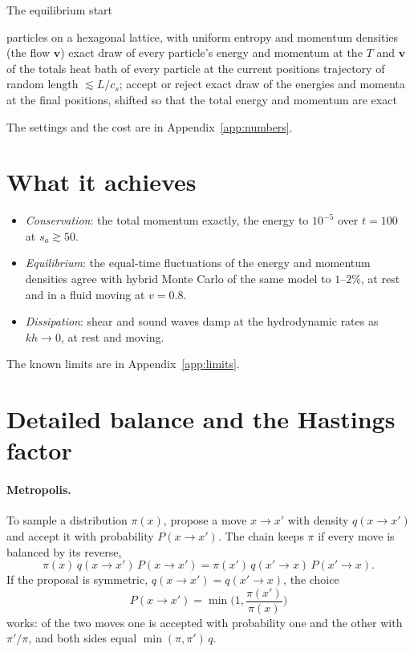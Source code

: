 \documentclass[11pt,aps,preprint,nofootinbib,superscriptaddress,tightenlines]{revtex4-2}
\def\st{\begin{equation}}
\def\stp{\end{equation}}
\def\App#1{Appendix~\ref{#1}}
\let\oldparagraph\paragraph
\renewcommand{\paragraph}{\par\bigskip\oldparagraph}
\begin{document}
\begin{algobox}{The equilibrium start}
\begin{algorithmic}[1]
\State particles on a hexagonal lattice, with uniform entropy and momentum densities (the flow $\bm v$)
\State exact draw of every particle's energy and momentum at the $T$ and $\bm v$ of the totals
  \State heat bath of every particle at the current positions
  \State trajectory of random length $\lesssim L/c_s$; accept or reject
\EndFor
\State exact draw of the energies and momenta at the final positions, shifted so that the total energy and momentum are exact
\end{algorithmic}
\end{algobox}

The settings and the cost are in \App{app:numbers}.

\section{What it achieves}
\label{sec:achieves}

\begin{itemize}
\item \emph{Conservation}: the total momentum exactly, the energy to $10^{-5}$ over $t=100$ at $s_a\gtrsim50$.
\item \emph{Equilibrium}: the equal-time fluctuations of the energy and momentum densities agree with hybrid Monte Carlo of the same model
  to $1$--$2\%$, at rest and in a fluid moving at $v=0.8$.
\item \emph{Dissipation}: shear and sound waves damp at the hydrodynamic rates as $kh\to0$, at rest and moving.
\end{itemize}
The known limits are in \App{app:limits}.

\appendix

\section{Detailed balance and the Hastings factor}
\label{app:mh}

\paragraph{Metropolis.}  To sample a distribution $\pi(x)$, propose a move $x\to x'$ with density $q(x\to x')$ and accept it with probability $P(x\to x')$.
The chain keeps $\pi$ if every move is balanced by its reverse,
\st
\pi(x)\,q(x\to x')\,P(x\to x')=\pi(x')\,q(x'\to x)\,P(x'\to x).
\stp
If the proposal is symmetric, $q(x\to x')=q(x'\to x)$, the choice
\st
P(x\to x')=\min\Big(1,\frac{\pi(x')}{\pi(x)}\Big)
\stp
works: of the two moves one is accepted with probability one and the other with $\pi'/\pi$, and both sides equal $\min(\pi,\pi')\,q$.
\end{document}
